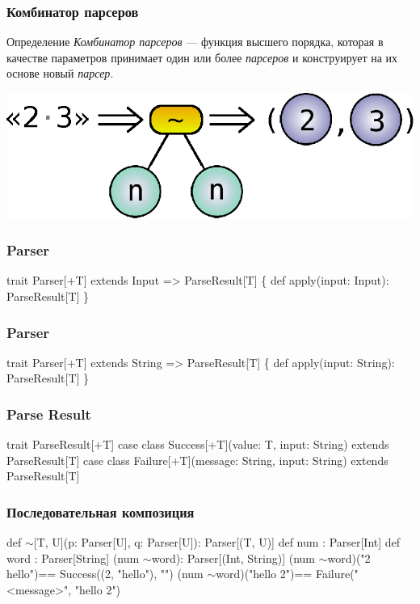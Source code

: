 \documentclass{beamer}
\newcommand{\mytilde}{$\sim$}
\begin{document}
\begin{frame}
  \frametitle{Комбинатор парсеров}
  \begin{block}{Определение}
    \textit{Комбинатор парсеров} --- функция высшего порядка, которая
    в качестве параметров принимает один или более \textit{парсеров} и
    конструирует на их основе новый \textit{парсер}.
  \end{block}

  \pause

  \begin{center}
    \includegraphics{images/combinator-example.eps}
  \end{center}
\end{frame}

\begin{frame}[fragile]
  \frametitle{Parser}
  \begin{semiverbatim}
trait Parser[+T]\pause{} extends Input => ParseResult[T]\pause{} \{
  def apply(input: Input): ParseResult[T]
\}
  \end{semiverbatim}
\end{frame}

\begin{frame}[fragile]
  \frametitle{Parser}
  \begin{semiverbatim}
trait Parser[+T] extends{\color{red} String} => ParseResult[T] \{
  def apply(input:{\color{red} String}): ParseResult[T]
\}
  \end{semiverbatim}
\end{frame}

\begin{frame}[fragile]
  \frametitle{Parse Result}
  \begin{semiverbatim}
trait ParseResult[+T]
\pause
case class
  Success[+T](value: T, input: String)
extends ParseResult[T]
\pause
case class
  Failure[+T](message: String, input: String)
extends ParseResult[T]
  \end{semiverbatim}
\end{frame}

\begin{frame}[fragile]
  \frametitle{Последовательная композиция}
  \begin{semiverbatim}
def \mytilde[T, U](p: Parser[U], q: Parser[U]): Parser[(T, U)]
\pause
def num : Parser[Int]
def word : Parser[String]
\pause
(num \mytilde word)\pause : Parser[(Int, String)]
\pause
(num \mytilde word)("2 hello")\pause == Success((2, "hello"), "")
\pause
(num \mytilde word)("hello 2")\pause == Failure("<message>",
                                    "hello 2")
  \end{semiverbatim}
\end{frame}
\end{document}
